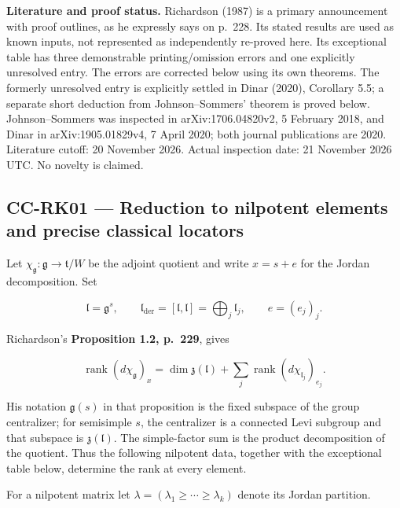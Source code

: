 \documentclass[11pt,a4paper]{article}
\theoremstyle{definition}\newtheorem{definition}[theorem]{Definition}
\theoremstyle{remark}\newtheorem{remark}[theorem]{Remark}
\begin{document}
\textbf{Literature and proof status.} Richardson (1987) is a primary announcement with proof outlines, as he expressly says on p.~228. Its stated results are used as known inputs, not represented as independently re-proved here. Its exceptional table has three demonstrable printing/omission errors and one explicitly unresolved entry. The errors are corrected below using its own theorems. The formerly unresolved entry is explicitly settled in Dinar (2020), Corollary 5.5; a separate short deduction from Johnson--Sommers' theorem is proved below. Johnson--Sommers was inspected in arXiv:1706.04820v2, 5 February 2018, and Dinar in arXiv:1905.01829v4, 7 April 2020; both journal publications are 2020. Literature cutoff: 20 November 2026. Actual inspection date: 21 November 2026 UTC. No novelty is claimed.

\subsection{CC-RK01 --- Reduction to nilpotent elements and precise classical locators}\label{cc-rk01-reduction-to-nilpotent-elements-and-precise-classical-locators}

Let \(\chi_{\mathfrak g}:\mathfrak g\to\mathfrak t/W\) be the adjoint quotient and write \(x=s+e\) for the Jordan decomposition. Set

\[
 \mathfrak l=\mathfrak g^s,
 \qquad \mathfrak l_{\mathrm{der}}=[\mathfrak l,\mathfrak l]
       =\bigoplus_j\mathfrak l_j,
 \qquad e=(e_j)_j.
\]

Richardson's \textbf{Proposition 1.2, p.~229}, gives

\[
 \operatorname{rank}(d\chi_{\mathfrak g})_x
   =\dim\mathfrak z(\mathfrak l)
       +\sum_j\operatorname{rank}(d\chi_{\mathfrak l_j})_{e_j}.
 \tag{CC-RK.1}
\]

His notation \(\mathfrak g(s)\) in that proposition is the fixed subspace of the group centralizer; for semisimple \(s\), the centralizer is a connected Levi subgroup and that subspace is \(\mathfrak z(\mathfrak l)\). The simple-factor sum is the product decomposition of the quotient. Thus the following nilpotent data, together with the exceptional table below, determine the rank at every element.

For a nilpotent matrix let \(\lambda=(\lambda_1\geq\cdots\geq\lambda_k)\) denote its Jordan partition.
\end{document}
